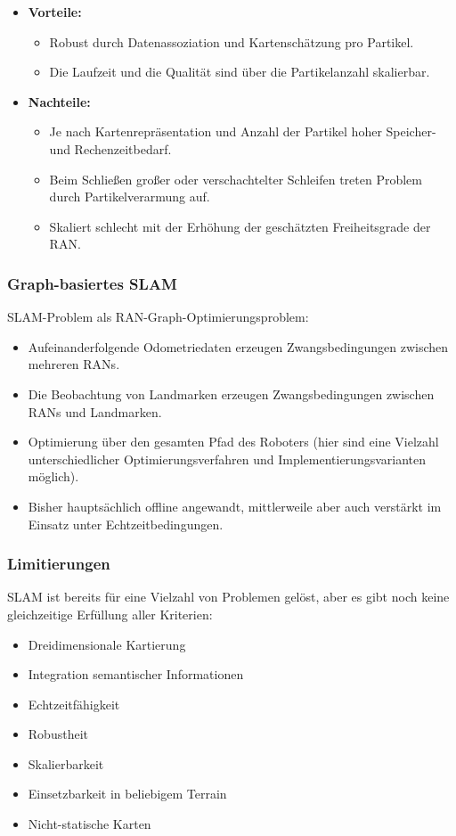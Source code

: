 \documentclass[a4paper, 11pt, accentcolor = tud3b]{tudreport}
\begin{document}
					\begin{itemize}
						\item \textbf{Vorteile:}
							\begin{itemize}
								\item Robust durch Datenassoziation und Kartenschätzung pro Partikel.
								\item Die Laufzeit und die Qualität sind über die Partikelanzahl skalierbar.
							\end{itemize}
						\item \textbf{Nachteile:}
							\begin{itemize}
								\item Je nach Kartenrepräsentation und Anzahl der Partikel hoher Speicher- und Rechenzeitbedarf.
								\item Beim Schließen großer oder verschachtelter Schleifen treten Problem durch Partikelverarmung auf.
								\item Skaliert schlecht mit der Erhöhung der geschätzten Freiheitsgrade der RAN.
							\end{itemize}
					\end{itemize}

				\subsubsection{Graph-basiertes SLAM}
					SLAM-Problem als RAN-Graph-Optimierungsproblem:
					\begin{itemize}
						\item Aufeinanderfolgende Odometriedaten erzeugen Zwangsbedingungen zwischen mehreren RANs.
						\item Die Beobachtung von Landmarken erzeugen Zwangsbedingungen zwischen RANs und Landmarken.
						\item Optimierung über den gesamten Pfad des Roboters (hier sind eine Vielzahl unterschiedlicher Optimierungsverfahren und Implementierungsvarianten möglich).
						\item Bisher hauptsächlich offline angewandt, mittlerweile aber auch verstärkt im Einsatz unter Echtzeitbedingungen.
					\end{itemize}

				\subsubsection{Limitierungen}
					SLAM ist bereits für eine Vielzahl von Problemen gelöst, aber es gibt noch keine gleichzeitige Erfüllung aller Kriterien:
					\begin{itemize}
						\item Dreidimensionale Kartierung
						\item Integration semantischer Informationen
						\item Echtzeitfähigkeit
						\item Robustheit
						\item Skalierbarkeit
						\item Einsetzbarkeit in beliebigem Terrain
						\item Nicht-statische Karten
					\end{itemize}
				
\end{document}
